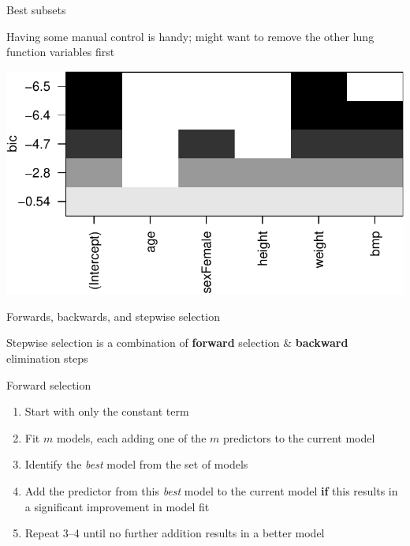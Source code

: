 \documentclass[10pt,ignorenonframetext,compress, aspectratio=169]{beamer}
\providecommand{\tightlist}{%
  \setlength{\itemsep}{0pt}\setlength{\parskip}{0pt}}
\begin{document}
\begin{frame}{Best subsets}

Having some manual control is handy; might want to remove the other lung
function variables first

\begin{center}\includegraphics[width=0.7\linewidth]{03-linear-models_files/figure-beamer/best-subsets-2-1} \end{center}

\end{frame}

\begin{frame}{Forwards, backwards, and stepwise selection}

\alert{Stepwise selection} is a combination of \textbf{forward}
selection \& \textbf{backward} elimination steps

\alert{Forward selection}

\begin{enumerate}
\def\labelenumi{\arabic{enumi}.}
\tightlist
\item
  Start with only the constant term
\item
  Fit \(m\) models, each adding one of the \(m\) predictors to the
  current model
\item
  Identify the \emph{best} model from the set of models
\item
  Add the predictor from this \emph{best} model to the current model
  \textbf{if} this results in a significant improvement in model fit
\item
  Repeat 3--4 until no further addition results in a better model
\end{enumerate}

\end{frame}
\end{document}

